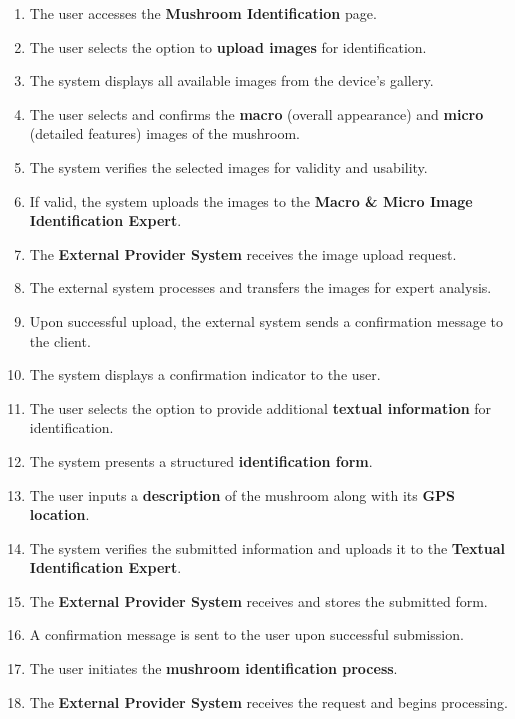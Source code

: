 \documentclass{article}
\begin{document}
\begin{enumerate}[{\bf BE1.}]
\begin{enumerate}[1.]
			\begingroup
			\color{red}
			\item The user accesses the \textbf{Mushroom Identification} page.  
			\item The user selects the option to \textbf{upload images} for identification.  
			\item The system displays all available images from the device’s gallery.  
			\item The user selects and confirms the \textbf{macro} (overall appearance) and \textbf{micro} (detailed features) images of the mushroom.  
			\item The system verifies the selected images for validity and usability.  
			\item If valid, the system uploads the images to the \textbf{Macro \& Micro Image Identification Expert}.  
			\item The \textbf{External Provider System} receives the image upload request.  
			\item The external system processes and transfers the images for expert analysis.  
			\item Upon successful upload, the external system sends a confirmation message to the client.  
			\item The system displays a confirmation indicator to the user.
			\item The user selects the option to provide additional \textbf{textual information} for identification.  
			\item The system presents a structured \textbf{identification form}.  
			\item The user inputs a \textbf{description} of the mushroom along with its \textbf{GPS location}.  
			\item The system verifies the submitted information and uploads it to the \textbf{Textual Identification Expert}.  
			\item The \textbf{External Provider System} receives and stores the submitted form.  
			\item A confirmation message is sent to the user upon successful submission.
			\item The user initiates the \textbf{mushroom identification process}.  
			\item The \textbf{External Provider System} receives the request and begins processing.  

\end{enumerate}
\end{enumerate}
\end{document}
